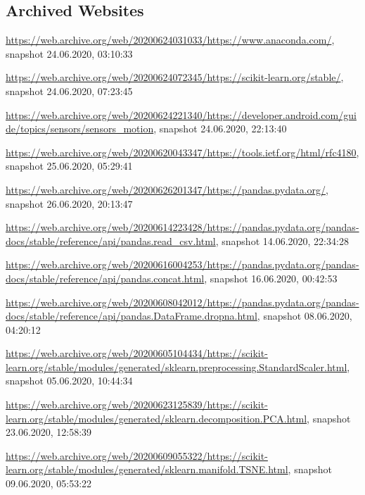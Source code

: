\begin{appendices}

	


\section{Archived Websites}
\label{appendix:archivedWebsites}
\sloppy
\url{https://web.archive.org/web/20200624031033/https://www.anaconda.com/}, snapshot 24.06.2020, 03:10:33

\url{https://web.archive.org/web/20200624072345/https://scikit-learn.org/stable/}, snapshot 24.06.2020, 07:23:45

\url{https://web.archive.org/web/20200624221340/https://developer.android.com/guide/topics/sensors/sensors_motion}, snapshot 24.06.2020, 22:13:40

\url{https://web.archive.org/web/20200620043347/https://tools.ietf.org/html/rfc4180}, snapshot 25.06.2020, 05:29:41

\url{https://web.archive.org/web/20200626201347/https://pandas.pydata.org/}, snapshot 26.06.2020, 20:13:47

\url{https://web.archive.org/web/20200614223428/https://pandas.pydata.org/pandas-docs/stable/reference/api/pandas.read_csv.html}, snapshot 14.06.2020, 22:34:28

\url{https://web.archive.org/web/20200616004253/https://pandas.pydata.org/pandas-docs/stable/reference/api/pandas.concat.html}, snapshot 16.06.2020, 00:42:53

\url{https://web.archive.org/web/20200608042012/https://pandas.pydata.org/pandas-docs/stable/reference/api/pandas.DataFrame.dropna.html}, snapshot 08.06.2020, 04:20:12

\url{https://web.archive.org/web/20200605104434/https://scikit-learn.org/stable/modules/generated/sklearn.preprocessing.StandardScaler.html}, snapshot 05.06.2020, 10:44:34

\url{https://web.archive.org/web/20200623125839/https://scikit-learn.org/stable/modules/generated/sklearn.decomposition.PCA.html}, snapshot 23.06.2020, 12:58:39

\url{https://web.archive.org/web/20200609055322/https://scikit-learn.org/stable/modules/generated/sklearn.manifold.TSNE.html}, snapshot 09.06.2020, 05:53:22


\end{appendices}
